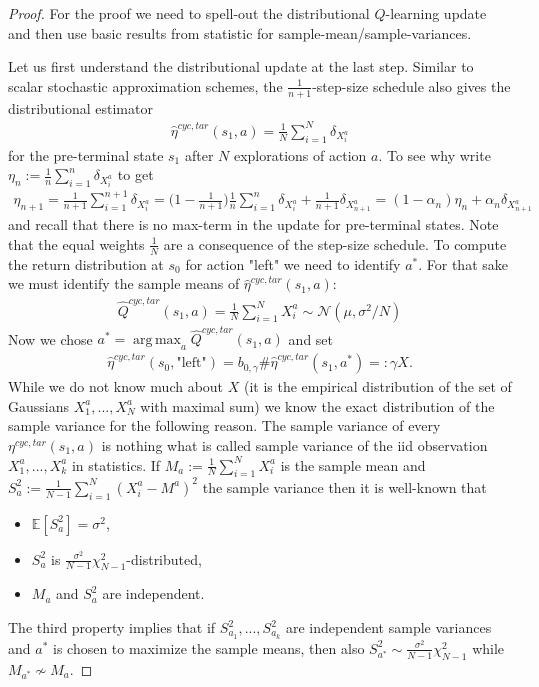 \documentclass{article}
\newcommand{\E}{\mathbb{E}}
\DeclareMathOperator{\argmax}{arg\,max}
\theoremstyle{plain}
\theoremstyle{definition}
\theoremstyle{remark}
\begin{document}
\begin{proof}
    For the proof we need to spell-out the distributional $Q$-learning update and then use basic results from statistic for sample-mean/sample-variances.

    Let us first understand the distributional update at the last step. Similar to scalar stochastic approximation schemes, the $\frac{1}{n+1}$-step-size schedule also gives the distributional estimator
    \begin{align}
        \hat\eta^{cyc, tar}(s_1,a)=\frac{1}{N}\sum_{i=1}^N \delta_{X_i^a}
    \end{align}    
    for the pre-terminal state $s_1$ after $N$ explorations of action $a$. To see why write $\eta_n:=\frac{1}{n}\sum_{i=1}^n\delta_{X^a_i}$ to get
    \begin{align*}
        \eta_{n+1}=\frac{1}{n+1}\sum_{i=1}^{n+1} \delta_{X_i^a}
        =\Big(1-\frac{1}{n+1}\Big)\frac{1}{n}\sum_{i=1}^{n} \delta_{X_i^a}+\frac{1}{n+1}\delta_{X^a_{n+1}}
        =(1-\alpha_n) \eta_n+\alpha_n \delta_{X^a_{n+1}}
    \end{align*} 
    and recall that there is no max-term in the update for pre-terminal states. Note that the equal weights $\frac{1}{N}$ are a consequence of the step-size schedule. To compute the return distribution at $s_0$ for action "left" we need to identify $a^*$. For that sake we must identify the sample means of $\hat \eta^{cyc,tar}(s_1,a)$:
    \begin{align*}
        \hat Q^{cyc,tar}(s_1,a)=\frac{1}{N}\sum_{i=1}^N X_i^a \sim \mathcal N(\mu,\sigma^2/N)
    \end{align*}
    Now we chose $a^*=\argmax_a \hat Q^{cyc,tar}(s_1,a)$ and set    
    \begin{align*}
        \hat\eta^{cyc, tar}(s_0,\text{"left"})
        =b_{0,\gamma} \# \hat\eta^{cyc,tar}(s_1,a^*)
        =: \gamma X.
    \end{align*}
    While we do not know much about $X$ (it is the empirical distribution of the set of Gaussians $X_1^a,...,X_N^a$ with maximal sum) we know the exact distribution of the sample variance for the following reason. The sample variance of every $\eta^{cyc, tar}(s_1,a)$ is nothing what is called sample variance of the iid observation $X_1^a,...,X_k^a$ in statistics. If $M_a:=\frac{1}{N}\sum_{i=1}^N X_i^a$ is the sample mean and $S_a^2:=\frac{1}{N-1}\sum_{i=1}^N(X_i^a-M^a)^2$ the sample variance then it is well-known that 
    \begin{itemize}
        \item $\E[S^2_a]=\sigma^2$,
        \item $S_a^2$ is $\frac{\sigma^2}{N-1}\chi^2_{N-1}$-distributed,
        \item $M_a$ and $S^2_a$ are independent.
    \end{itemize}
    The third property implies that if $S^2_{a_1},...,S^2_{a_k}$ are independent sample variances and $a^*$ is chosen to maximize the sample means, then also $S^2_{a^*}\sim \frac{\sigma^2}{N-1} \chi^2_{N-1}$ while $M_{a^*}\nsim M_a$. 
\end{proof}
\end{document}
